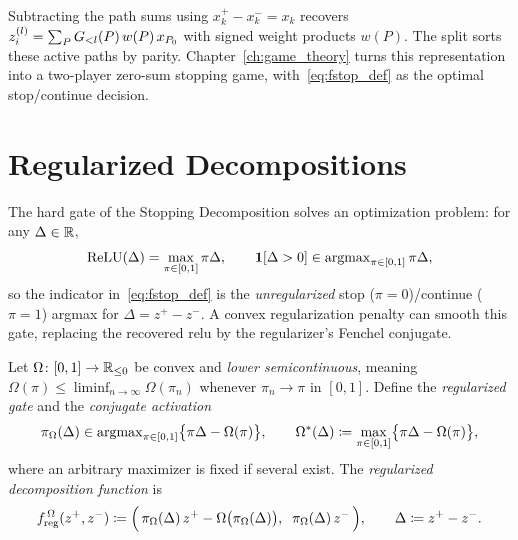 Subtracting the path sums using $x_k^+-x_k^-=x_k$ recovers $z^{(l)}_i=\sum_P G_{<l}(P)\,w(P)\,x_{P_0}$ with signed weight products $w(P)$. The split sorts these active paths by parity. Chapter~\ref{ch:game_theory} turns this representation into a two-player zero-sum stopping game, with~\eqref{eq:fstop_def} as the optimal stop/continue decision.

\section{Regularized Decompositions}\label{sec:regularized_decompositions}

The hard gate of the Stopping Decomposition solves an optimization problem: for any $\Delta \in \mathbb{R}$,
\begin{equation}
	\text{ReLU}(\Delta) = \max_{\pi \in [0,1]} \pi \Delta,
	\qquad
	\mathbf{1}[\Delta > 0] \in \operatorname{argmax}_{\pi \in [0,1]} \pi \Delta,
	\label{eq:gate_as_argmax}
\end{equation}
so the indicator in~\eqref{eq:fstop_def} is the \emph{unregularized} stop ($\pi = 0$)/continue ($\pi = 1$) argmax for $\Delta = z^+ - z^-$. A convex regularization penalty can smooth this gate, replacing the recovered \ac{relu} by the regularizer's Fenchel conjugate.

\begin{definition}\label{def:freg}
Let $\Omega \colon [0,1] \to \mathbb{R}_{\le 0}$ be convex and \emph{lower semicontinuous}, meaning $\Omega(\pi)\le\liminf_{n\to\infty}\Omega(\pi_n)$ whenever $\pi_n\to\pi$ in $[0,1]$. Define the \emph{regularized gate} and the \emph{conjugate activation}
\begin{equation}
	\pi_\Omega(\Delta) \in \operatorname{argmax}_{\pi \in [0,1]} \bigl\{ \pi \Delta - \Omega(\pi) \bigr\},
	\qquad
	\Omega^*(\Delta) \coloneqq \max_{\pi \in [0,1]} \bigl\{ \pi \Delta - \Omega(\pi) \bigr\},
	\label{eq:regularized_gate}
\end{equation}
where an arbitrary maximizer is fixed if several exist. The \emph{regularized decomposition function} is
\begin{equation}
	f_{\mathrm{reg}}^{\,\Omega}(z^+, z^-) \coloneqq \Bigl(\, \pi_\Omega(\Delta)\, z^+ - \Omega\bigl(\pi_\Omega(\Delta)\bigr), \;\; \pi_\Omega(\Delta)\, z^- \,\Bigr),
	\qquad
	\Delta \coloneqq z^+ - z^-.
	\label{eq:freg_def}
\end{equation}
\end{definition}

